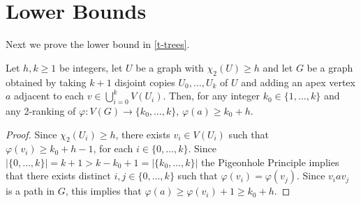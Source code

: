\documentclass[kpfonts]{patmorin}
\DeclareMathOperator{\pw}{pw}
\newcommand{\trn}{\chi_2}
\theoremstyle{named}
\begin{document}
%
%
%
%
%
%

\section{Lower Bounds}
\label{lower-bounds}

Next we prove the lower bound in \cref{t-trees}.

\begin{lem}\label{apex-graph}
    Let $h,k\ge 1$ be integers, let $U$ be a graph with $\trn(U)\ge h$ and let $G$ be a graph obtained by taking $k+1$ disjoint copies $U_0,\ldots,U_k$ of $U$ and adding an apex vertex $a$ adjacent to each $v\in\bigcup_{i=0}^k V(U_i)$.  Then, for any integer $k_0\in \{1,\ldots,k\}$ and any 2-ranking of $\varphi:V(G)\to\{k_0,\ldots,k\}$, $\varphi(a) \ge k_0+h$.
\end{lem}

\begin{proof}
    Since $\trn(U_i)\ge h$, there exists $v_i\in V(U_i)$ such that $\varphi(v_i)\ge k_0+h-1$, for each $i\in\{0,\ldots,k\}$.  Since $|\{0,\ldots,k\}|=k+1>k-k_0+1=|\{k_0,\ldots,k\}|$ the Pigeonhole Principle implies that there exists distinct $i,j\in\{0,\ldots,k\}$ such that $\varphi(v_i)=\varphi(v_j)$.  Since $v_i a v_j$ is a path in $G$, this implies that $\varphi(a)\ge \varphi(v_i)+1\ge k_0+h$.
\end{proof}
\end{document}
